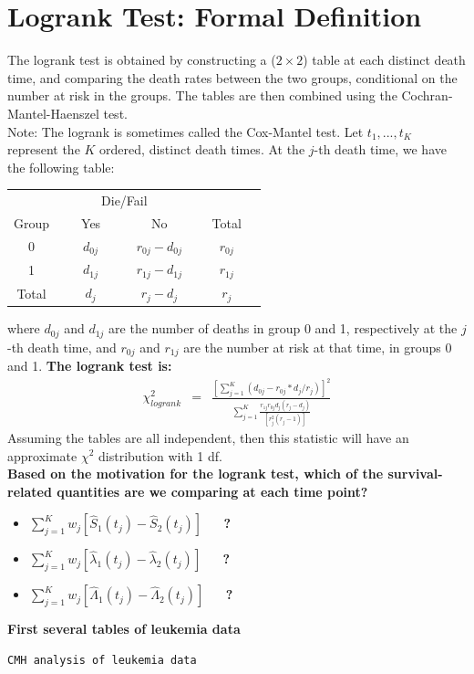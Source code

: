 \documentclass[11pt,slidesonly,semrot,portrait,palatino]{book}
\begin{document}
{\section{Logrank Test: Formal Definition}
The logrank test is obtained by constructing a ($2 \times 2$) table
at each distinct death time, and comparing the death rates between
the two groups, conditional on the number at risk in the groups.
The tables are then combined using the Cochran-Mantel-Haenszel test.
\\[2ex]
Note: The logrank is sometimes called the Cox-Mantel test.
Let $t_1,...,t_K$ represent the $K$ ordered, distinct death times.
At the $j$-th death time, we have the following table:
\begin{center}
\begin{tabular}{cccc}
\hline \hline
& \multicolumn{2}{c}{Die/Fail} & \\ \cline{2-3}
\multicolumn{1}{c}{Group } & ~~~Yes~~~ & ~~~No~~~ & ~~Total~~\\ \hline
0 & $d_{0j}$ & $r_{0j} - d_{0j}$ & $r_{0j}$ \\[2ex]
1 & $d_{1j}$ & $r_{1j} - d_{1j}$ & $r_{1j}$ \\[2ex]
\hline
Total &  $d_j$ & $r_j - d_j$ & $r_j$  \\ \hline \hline
\end{tabular}
\end{center}
where $d_{0j}$ and $d_{1j}$ are the number of deaths in
group 0 and 1, respectively at the $j$-th death time, and
$r_{0j}$ and $r_{1j}$ are the number at risk at that time,
in groups 0 and 1.
{\bf The logrank test is:}
\begin{eqnarray*}
\chi^2_{logrank} & = &
\frac{[\sum_{j=1}^K (d_{0j} - r_{0j}*d_j/r_j)]^2}
{\sum_{j=1}^K  \frac{r_{1j} r_{0j} d_j (r_j-d_j)}{[r_j^2(r_j-1)]}}
\end{eqnarray*}
Assuming the tables are all independent, then this statistic
will have an approximate $\chi^2$ distribution with 1 df.
\\[2ex]
{\bf Based on the motivation for the logrank test, which of
the survival-related quantities are we comparing at each
time point?}
\begin{itemize}
\item $\sum_{j=1}^K w_j \left[\hat{S}_1(t_j) - \hat{S}_2(t_j)\right]$ ~~ {\bf ?}
\item $\sum_{j=1}^K w_j \left[\hat\lambda_1(t_j) - \hat\lambda_2(t_j)\right]$ ~~ {\bf ?}
\item $\sum_{j=1}^K w_j \left[\hat\Lambda_1(t_j) - \hat\Lambda_2(t_j)\right]$ ~~ {\bf ?}
\end{itemize}
{\bf First several tables of leukemia data}
\small
\begin{verbatim}
CMH analysis of leukemia data


\end{verbatim}}
\end{document}
